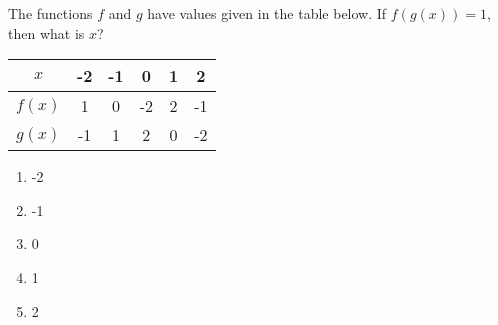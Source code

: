 \bigskip

\item The functions $f$ and $g$ have values given in the table below.  If $f(g(x)) = 1$, then what is $x$?

\begin{tabular}{|c|c|c|c|c|c|}
\hline
$x$ & -2 & -1 & 0 & 1 & 2 \\
\hline
$f(x)$ & 1 & 0 & -2 & 2 & -1 \\
\hline
$g(x)$ & -1 & 1 & 2 & 0 & -2 \\
\hline
\end{tabular}

\begin{enumerate}
\item -2 
\item -1 
\item 0 
\item 1 
\item 2 
\end{enumerate}

